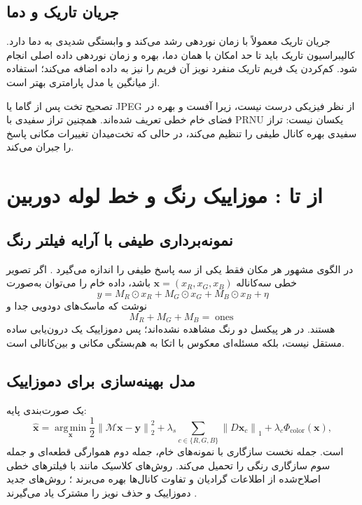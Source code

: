 \documentclass[12pt,openany,oneside]{book}
\newcommand{\norm}[1]{\left\lVert #1\right\rVert}
\newcommand{\vect}[1]{\bm{#1}}
\newcommand{\op}[1]{\mathcal{#1}}
\newcommand{\argmin}{\operatorname*{arg\,min}}
\begin{document}
\subsection{جریان تاریک و دما}

جریان تاریک معمولاً با زمان نوردهی رشد می‌کند و وابستگی شدیدی به دما دارد. کالیبراسیون تاریک باید
تا حد امکان با همان دما، بهره و زمان نوردهی داده اصلی انجام شود. کم‌کردن یک فریم تاریک منفرد نویز
آن فریم را نیز به داده اضافه می‌کند؛ استفاده از میانگین یا مدل پارامتری بهتر است.

\begin{warningbox}
تصحیح تخت پس از گاما یا JPEG از نظر فیزیکی درست نیست، زیرا آفست و بهره در فضای خام خطی تعریف
شده‌اند. همچنین تراز سفیدی با PRNU یکسان نیست: تراز سفیدی بهره کانال طیفی را تنظیم می‌کند، در حالی
که تخت‌میدان تغییرات مکانی پاسخ را جبران می‌کند.
\end{warningbox}

\section{از  تا : موزاییک رنگ و خط لوله دوربین}

\subsection{نمونه‌برداری طیفی با آرایه فیلتر رنگ}

در الگوی مشهور  هر مکان فقط یکی از سه پاسخ طیفی را اندازه می‌گیرد
\cite{bayer1976patent}. اگر تصویر خطی سه‌کاناله \(\vect x=(x_R,x_G,x_B)\) باشد، داده خام را می‌توان
به‌صورت
\begin{equation}
y= M_R\odot x_R+M_G\odot x_G+M_B\odot x_B+\eta
\label{eq:bayer-forward}
\end{equation}
نوشت که ماسک‌های دودویی جدا و
\begin{equation}
M_R+M_G+M_B=\operatorname{ones}
\end{equation}
هستند. در هر پیکسل دو رنگ مشاهده نشده‌اند؛ پس دموزاییک یک درون‌یابی ساده مستقل نیست، بلکه
مسئله‌ای معکوس با اتکا به هم‌بستگی مکانی و بین‌کانالی است.

\subsection{مدل بهینه‌سازی برای دموزاییک}

یک صورت‌بندی پایه:
\begin{equation}
\widehat{\vect x}=\argmin_{\vect x}
\frac12\norm{\op M\vect x-\vect y}_2^2
+\lambda_s\sum_{c\in\{R,G,B\}}\norm{D\vect x_c}_1
+\lambda_c\Phi_{\mathrm{color}}(\vect x),
\label{eq:demosaic-optimization}
\end{equation}
است. جمله نخست سازگاری با نمونه‌های خام، جمله دوم هموارگی قطعه‌ای و جمله سوم سازگاری رنگی را
تحمیل می‌کند. روش‌های کلاسیک مانند  با فیلترهای خطی اصلاح‌شده از اطلاعات
گرادیان و تفاوت کانال‌ها بهره می‌برند \cite{malvar2004demosaic}؛ روش‌های جدید دموزاییک و حذف نویز
را مشترک یاد می‌گیرند \cite{ehret2019joint}.
\end{document}
